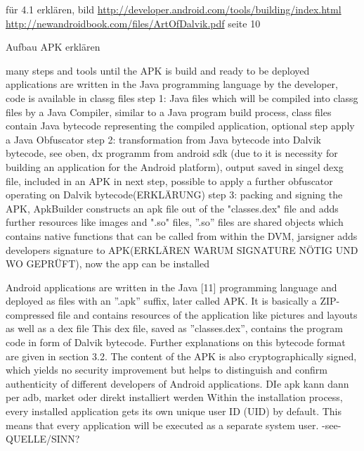 \cite{kovachevaMaster} \cite{ehringerDalvik}
%

für 4.1 erklären, bild
\url{http://developer.android.com/tools/building/index.html} \url{http://newandroidbook.com/files/ArtOfDalvik.pdf} seite 10\newline

Aufbau APK erklären\newline

many steps and tools until the APK is build and ready to be deployed\newline
applications are written in the Java programming language by the developer, code is available in \gls{classg} files\newline
step 1:  Java files which will be compiled into \gls{classg} files by a Java Compiler,  similar to a Java program build process, class files contain Java bytecode representing the compiled application, optional step apply a Java Obfuscator\newline
step 2: transformation from Java bytecode into Dalvik bytecode, see oben, dx programm from android sdk (due to it is necessity for building an application for the Android platform), output saved in singel \gls{dexg} file, included in an APK in next step, possible to apply a further obfuscator operating
on Dalvik bytecode(ERKLÄRUNG)\newline
step 3: packing and signing the APK, ApkBuilder constructs an apk file out of the "classes.dex" file and adds further resources like images and ".so" files, ”.so” files are shared objects which contains native functions that can be called from within the DVM, jarsigner adds developers signature to APK(ERKLÄREN WARUM SIGNATURE NÖTIG UND WO GEPRÜFT), now the app can be installed



Android applications are written in the Java [11] programming language and deployed as files with an ”.apk” suffix, later called APK. It is basically a ZIP-compressed file and contains resources of the application like pictures and layouts as well as a dex file\newline
This dex file, saved as ”classes.dex”, contains the program code in form of Dalvik bytecode. Further explanations on this bytecode format are given in section 3.2. The content of the APK is also cryptographically signed, which yields no security improvement but helps to distinguish and confirm authenticity of different developers of Android applications.\newline
DIe apk kann dann per adb, market oder direkt installiert werden\newline
Within the installation process, every installed application gets its own unique user ID (UID) by default. This means that every application will be executed as a separate system user. -see- QUELLE/SINN?\newline
